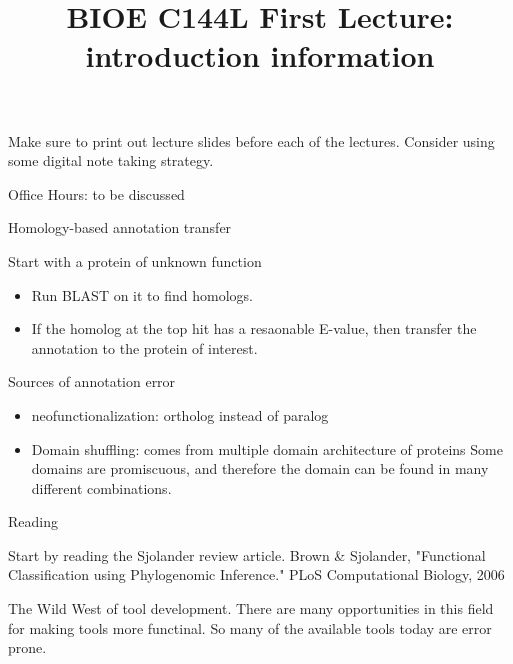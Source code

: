 \documentclass[11pt]{article}
\title{BIOE C144L First Lecture: introduction information}
\begin{document}
\maketitle

Make sure to print out lecture slides before each of the lectures. Consider 
using some digital note taking strategy.

Office Hours: to be discussed

Homology-based annotation transfer

Start with a protein of unknown function
\begin{itemize}
\item Run BLAST on it to find homologs.

\item If the homolog at the top hit has a resaonable E-value, then transfer
  the annotation to the protein of interest.
\end{itemize}
Sources of annotation error

\begin{itemize}
\item neofunctionalization: ortholog instead of paralog
\item Domain shuffling: comes from multiple domain architecture of proteins
  Some domains are promiscuous, and therefore the domain can be found in many 
  different combinations.
\end{itemize}

Reading

Start by reading the Sjolander review article. 
Brown \& Sjolander, "Functional Classification using Phylogenomic Inference." PLoS Computational Biology, 2006 


The Wild West of tool development. There are many opportunities in this 
field for making tools more functinal. So many of the available tools today
are error prone. 
\end{document}
